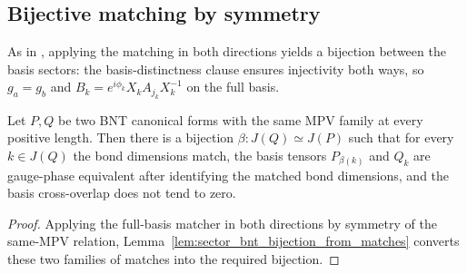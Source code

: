 \subsection{Bijective matching by symmetry}
\label{subsec:sector_bnt_strong_match_bijective_symmetry}

As in \cite[Appendix~A]{Cirac2016MPDO_arXiv}, applying the matching in both
directions yields a bijection between the basis sectors: the basis-distinctness
clause ensures injectivity both ways, so $g_a = g_b$ and
$B_k = e^{i\phi_k} X_k A_{j_k} X_k^{-1}$ on the full basis.

\begin{theorem}
    \label{thm:sector_bnt_bijective_match_of_sameMPV}
    \leanok
    Let $P, Q$ be two BNT canonical forms with the same MPV family at every
    positive length. Then there is a bijection
    $\beta : J(Q) \simeq J(P)$ such that for every $k \in J(Q)$ the bond
    dimensions match, the basis tensors $P_{\beta(k)}$ and $Q_k$ are
    gauge-phase equivalent after identifying the matched bond dimensions, and
    the basis cross-overlap does not tend to zero.
\end{theorem}

\begin{proof}\leanok
    Applying the full-basis matcher in both directions by symmetry of the
    same-MPV relation, Lemma~\ref{lem:sector_bnt_bijection_from_matches}
    converts these two families of matches into the required bijection.
\end{proof}
